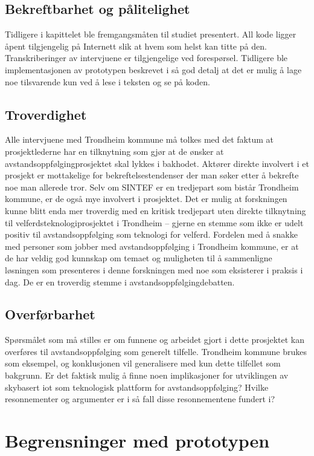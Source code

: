 \subsection{Bekreftbarhet og pålitelighet}
Tidligere i kapittelet ble fremgangsmåten til studiet presentert. All kode ligger åpent tilgjengelig på Internett slik at hvem som helst kan
titte på den. Transkriberinger av intervjuene er tilgjengelige ved forespørsel. Tidligere ble implementasjonen av prototypen beskrevet i
så god detalj at det er mulig å lage noe tilsvarende kun ved å lese i teksten og se på koden.

\subsection{Troverdighet}
Alle intervjuene med Trondheim kommune må tolkes med det faktum at prosjektlederne har en tilknytning som
gjør at de ønsker at avstandsoppfølgingprosjektet
skal lykkes i bakhodet. Aktører direkte involvert i et prosjekt er mottakelige for bekreftelsestendenser der man søker etter å bekrefte noe
man allerede tror. Selv om SINTEF er en tredjepart som bistår Trondheim kommune, er de også mye involvert i prosjektet.
Det er mulig at forskningen kunne blitt enda mer troverdig med en kritisk tredjepart uten direkte tilknytning til velferdsteknologiprosjektet i Trondheim --
gjerne en stemme som ikke er udelt positiv til avstandsoppfølging som teknologi for velferd.
Fordelen med å snakke med personer som jobber med avstandsoppfølging i Trondheim kommune, er at de har veldig god kunnskap om temaet
og muligheten til å sammenligne løsningen som presenteres i denne forskningen med noe som eksisterer i praksis i dag.
De er en troverdig stemme i avstandsoppfølgingdebatten.

\subsection{Overførbarhet}
Spørsmålet som må stilles er om funnene og arbeidet gjort i dette prosjektet kan overføres til avstandsoppfølging som generelt tilfelle.
Trondheim kommune brukes som eksempel, og konklusjonen vil generalisere med kun dette tilfellet som bakgrunn.
Er det faktisk mulig å finne noen implikasjoner for utviklingen av skybasert \gls{iot} som teknologisk plattform for avstandsoppfølging?
Hvilke resonnementer og argumenter er i så fall disse resonnementene fundert i?

\iffalse
\section{Begrensninger med
prototypen}\label{begrensninger-med-prototypen}

